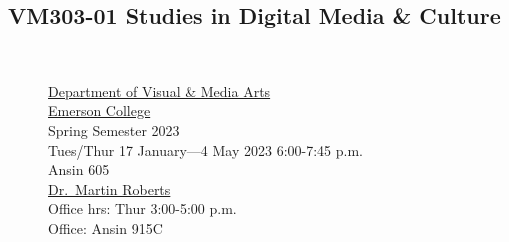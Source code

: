 \documentclass[
  letterpaper,
  DIV=11,
  numbers=noendperiod]{scrartcl}
\author{}
\date{}
\begin{document}
\ifdefined\Shaded\renewenvironment{Shaded}{\begin{tcolorbox}[boxrule=0pt, borderline west={3pt}{0pt}{shadecolor}, frame hidden, sharp corners, breakable, interior hidden, enhanced]}{\end{tcolorbox}}\fi

\hypertarget{vm303-01-studies-in-digital-media-culture}{%
\subsection{VM303-01 Studies in Digital Media \&
Culture}\label{vm303-01-studies-in-digital-media-culture}}

\begin{figure}

\begin{minipage}[t]{0.49\linewidth}

{\centering 


\caption{}

}

\end{minipage}%
%
\begin{minipage}[t]{0.02\linewidth}

{\centering 

~

}

\end{minipage}%
%
\begin{minipage}[t]{0.49\linewidth}

{\centering 

\href{https://emerson.edu/academics/academic-departments/visual-media-arts}{Department
of Visual \& Media Arts}\\
\href{https://emerson.edu/}{Emerson College}\\
Spring Semester 2023\\
Tues/Thur 17 January---4 May 2023 6:00-7:45 p.m.\\
Ansin 605\\
\href{http://mroberts.emerson.build/}{Dr.~Martin Roberts}\\
Office hrs: Thur 3:00-5:00 p.m.\\
Office: Ansin 915C\\

}

\end{minipage}%

\end{figure}
\end{document}
